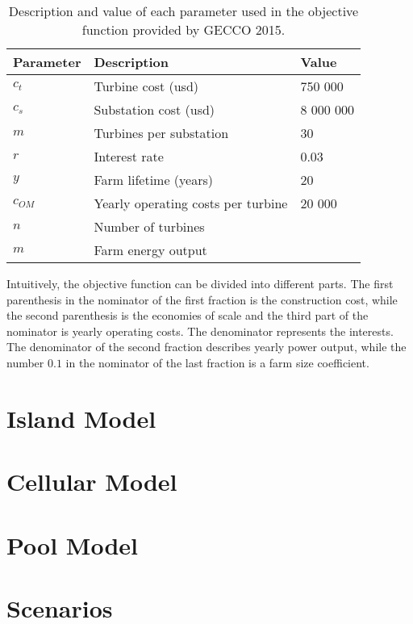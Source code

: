 \begin{table}[h!]
\begin{center}
\caption{Description and value of each parameter used in the objective function provided by GECCO 2015.}
\label{Parameters}
\begin{tabular}{l|l|l}
\textbf{Parameter} & \textbf{Description} & \textbf{Value} \\ 
\hline 
$c_t$ & Turbine cost (usd) & 750 000 \\ 
$c_s$ & Substation cost (usd) & 8 000 000 \\ 
$m$ & Turbines per substation & 30 \\ 
$r$ & Interest rate & 0.03 \\ 
$y$ & Farm lifetime (years) & 20 \\ 
$c_{OM}$ & Yearly operating costs per turbine & 20 000 \\ 
$n$ & Number of turbines &  \\ 
$m$ & Farm energy output &  \\  
\end{tabular} 
\end{center}
\end{table}


\noindent Intuitively, the objective function can be divided into different parts. The first parenthesis in the nominator of the first fraction is the construction cost, while the second parenthesis is the economies of scale and the third part of the nominator is yearly operating costs. The denominator represents the interests. The denominator of the second fraction describes yearly power output, while the number $0.1$ in the nominator of the last fraction is a farm size coefficient. \\


\section{Island Model}\label{section:island model}


\section{Cellular Model}\label{section:cellular model}


\section{Pool Model}\label{section:pool model}


\section{Scenarios}\label{section:scenarios}


